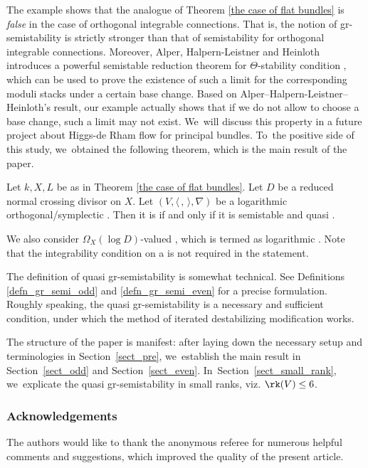 The example shows that the analogue of Theorem \ref{the case of flat bundles} is \emph{false} in the case of orthogonal integrable connections. That is, the notion of gr-semistability is strictly stronger than that of semistability for orthogonal integrable connections. Moreover, Alper, Halpern-Leistner and Heinloth introduces a powerful semistable reduction theorem for $\Theta$-stability condition \cite[Th.\,6.5]{AHLH23}, which can be used to prove the existence of such a limit for the corresponding moduli stacks under a certain base change. Based on Alper--Halpern-Leistner--Heinloth's result, our example actually shows that if we do not allow to choose a base change, such a limit may not exist. We~will discuss this property in a future project about Higgs-de Rham flow for principal bundles. To~the positive side of this study, we~obtained the following theorem, which is the main result of the paper.
\begin{thm}
Let $k,X,L$ be as in Theorem \ref{the case of flat bundles}. Let $D$ be a reduced normal crossing divisor on $X$. Let $(V,\langle \,, \, \rangle,\nabla)$ be a logarithmic orthogonal/symplectic \lconnection. Then it is \grsemistable if and only if it is semistable and quasi \grsemistable.
\end{thm}
\begin{rem}
We also consider $\Omega_X(\log D)$-valued \lconnections, which is termed as logarithmic \lconnections. Note that the integrability condition on a \lconnection is not required in the statement.
\end{rem}

The definition of quasi gr-semistability is somewhat technical. See Definitions \ref{defn_gr_semi_odd} and \ref{defn_gr_semi_even} for a precise formulation. Roughly speaking, the quasi gr-semistability is a necessary and sufficient condition, under which the method of iterated destabilizing modification works.

The structure of the paper is manifest: after laying down the necessary setup and terminologies in Section~\ref{sect_pre}, we~establish the main result in Section~\ref{sect_odd} and Section~\ref{sect_even}. In~Section~\ref{sect_small_rank}, we~explicate the quasi gr-semistability in small ranks, viz. $\rk(V)\leq 6$.

\subsubsection*{Acknowledgements}
The authors would like to thank the anonymous referee for numerous helpful comments and suggestions, which improved the quality of the present article.

